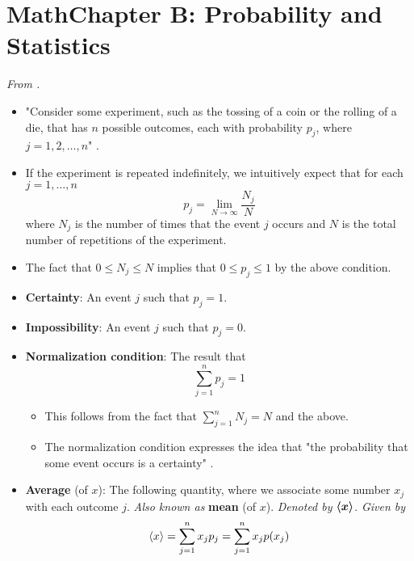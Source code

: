 \documentclass[../notes.tex]{subfiles}
\begin{document}
\section{MathChapter B: Probability and Statistics}
\emph{From \textcite{bib:McQuarrieSimon}.}
\begin{itemize}
    \item {}"Consider some experiment, such as the tossing of a coin or the rolling of a die, that has $n$ possible outcomes, each with probability $p_j$, where $j=1,2,\dots,n$" \parencite[63]{bib:McQuarrieSimon}.
    \item If the experiment is repeated indefinitely, we intuitively expect that for each $j=1,\dots,n$
    \begin{equation*}
        p_j = \lim_{N\to\infty}\frac{N_j}{N}
    \end{equation*}
    where $N_j$ is the number of times that the event $j$ occurs and $N$ is the total number of repetitions of the experiment.
    \item The fact that $0\leq N_j\leq N$ implies that $0\leq p_j\leq 1$ by the above condition.
    \item \textbf{Certainty}: An event $j$ such that $p_j=1$.
    \item \textbf{Impossibility}: An event $j$ such that $p_j=0$.
    \item \textbf{Normalization condition}: The result that
    \begin{equation*}
        \sum_{j=1}^np_j = 1
    \end{equation*}
    \begin{itemize}
        \item This follows from the fact that $\sum_{j=1}^nN_j=N$ and the above.
        \item The normalization condition expresses the idea that "the probability that some event occurs is a certainty" \parencite[64]{bib:McQuarrieSimon}.
    \end{itemize}
    \item \textbf{Average} (of $x$): The following quantity, where we associate some number $x_j$ with each outcome $j$. \emph{Also known as} \textbf{mean} (of $x$). \emph{Denoted by} $\bm{\langle{x}\rangle}$. \emph{Given by}
    \begin{equation*}
        \langle{x}\rangle = \sum_{j=1}^nx_jp_j = \sum_{j=1}^nx_jp(x_j)
    \end{equation*}
    \begin{figure}[h!]
        \centering
\end{figure}
\end{itemize}
\end{document}
